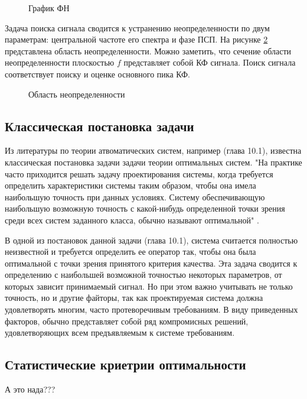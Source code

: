\begin{figure}[H]
\center{}
\caption{График ФН}
\label{pic:corr_peak}
\end{figure}

Задача поиска сигнала сводится к устранению неопределенности по двум параметрам: центральной частоте его спектра
и фазе ПСП. На рисунке \ref{pic:ambiguity_region} представлена область неопределенности. Можно заметить, что сечение
области неопределенности плоскостью ${f}$ представляет собой КФ сигнала. Поиск сигнала соответствует поиску и
оценке основного пика КФ.

\begin{figure}[H]
\center{}
\caption{Область неопределенности}
\label{pic:ambiguity_region}
\end{figure}

\subsection{Классическая постановка задачи}
\label{sec1_FIXME}

Из литературы по теории атвоматических систем, например \cite{pugachev} (глава 10.1), известна классическая постановка
задачи задачи теории оптимальных систем. "На практике часто приходится решать задачу проектирования системы, когда
требуется определить характеристики системы таким образом, чтобы она имела наибольшую точность при данных условиях.
Систему обеспечивающую наибольшую возможную точность с какой-нибудь определенной точки зрения среди всех систем
заданного класса, обычно называют оптимальной" \cite{pugachev}.

В одной из постановок данной задачи \cite{pugachev} (глава 10.1), система считается полностью неизвестной
и требуется определить ее оператор так, чтобы она была оптимальной с точки зрения принятого критерия качества. Эта
задача сводится к определению с наибольшей возможной точностью некоторых параметров, от которых зависит принимаемый
сигнал. Но при этом важно учитывать не только точность, но и другие файторы, так как проектируемая система должна
удовлетворять многим, часто протеворечивым требованиям. В виду приведенных факторов, обычно представляет собой
ряд компромисных решений, удовлетворяющих всем предъявляемым к системе требованиям.

\subsection{Статистические криетрии оптимальности}
А это нада???

